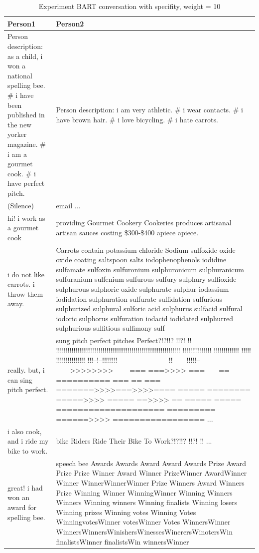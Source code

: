 \begin{table}[ht]
\centering
 \begin{tabular}{|p{7cm}|p{8cm}|} 
 \hline\hline
 \textbf{Person1} & \textbf{Person2} \\
 \hline\hline
 Person description: as a child, i won a national spelling bee. \# i have been published in the new yorker magazine. \# i am a gourmet cook. \# i have perfect pitch. & Person description: i am very athletic. \# i wear contacts. \# i have brown hair. \# i love bicycling. \# i hate carrots. \\
 \hline
 (Silence) & email ...\\ 
 \hline
 hi! i work as a gourmet cook & providing Gourmet Cookery Cookeries produces artisanal artisan sauces costing \$300-\$400 apiece apiece.\\
 \hline
 i do not like carrots. i throw them away. & Carrots contain potassium chloride Sodium sulfoxide oxide oxide coating saltspoon salts iodophenophenols iodidine sulfamate sulfoxin sulfuronium sulphuronicum sulphuranicum sulfuranium sulfenium sulfurous sulfury sulphury sulfioxide sulphurous sulphoric oxide sulphurate sulphur iodassium iodidation sulphuration sulfurate sulfidation sulfurious sulphurized sulphural sulforic acid sulphurus sulfacid sulfural iodoric sulphorus sulfuration iodacid iodidated sulphurred sulphurious sulfitious sulfimony sulf \\
 \hline 
 really. but, i can sing pitch perfect. & sung pitch perfect pitches Perfect?!?!!? !!?! !! !!!!!!!!!!!!!!!!!!!!!!!!!!!!!!!!!!!!!!!!!!!!!!!!!!!!!!!!!!!!!!!! !!!!!!!!!!!!!!! !!!!!!!!!!!!! !!!!! !!!!!!!!!!!!!!! !!!--!--!!!!!!!!~~~~~~~~~~~~~~ !!~~~~!!!!!--~~~~>>>>>>>>~~~~ === ===>>>> ===~~~~== ========== === == === =======>>>>===>>>>==== ===== ======== =====>>>> ===== ==>>>> == ===== ===== ==================== ========= ======>>>> ================= ...\\
 \hline
 i also cook, and i ride my bike to work. & bike Riders Ride Their Bike To Work?!?!!? !!?! !! ... \\
 \hline 
 great! i had won an award for spelling bee. & speech bee Awards Awards Award Award Awards Prize Award Prize Prize Winner Award Winner PrizeWinner AwardWinner Winner WinnerWinnerWinner Prize Winners Award Winners Prize Winning Winner WinningWinner Winning Winners Winners Winning winners Winning finalists Winning losers Winning prizes Winning votes Winning Votes WinningvotesWinner votesWinner Votes WinnersWinner WinnersWinnersWinishersWinessesWinerersWinotersWin finalistsWinner finalistsWin winnersWinner \\
 \hline\hline
 \end{tabular}
 \caption{Experiment BART conversation with specifity, weight = 10}
\label{tab:bart_conversation_idf5}
\end{table}

